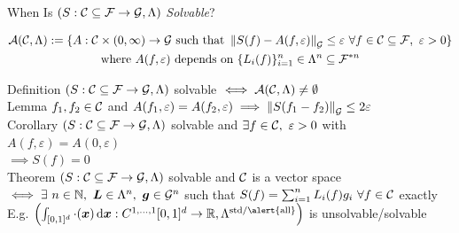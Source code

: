 \documentclass[11pt,compress,xcolor={usenames,dvipsnames},aspectratio=169]{beamer}
\newcommand{\sol}{S}
\newcommand{\app}{A}
\begin{document}
\begin{frame}{When Is $(S:\cc \subseteq \cf\to\cg,\Lambda)$ \emph{Solvable}?}

\vspace{-7ex}
\begin{multline*}
     \ca(\cc,\Lambda) : = \{\app: \cc \times (0,\infty) \to \cg \text{ such that } 
\norm[\cg]{\sol(f) - \app(f,\varepsilon) } \le \varepsilon \ \forall f \in \cc \subseteq \cf, \ \varepsilon > 0 \}
  \\
  \text{where $A(f,\varepsilon)$ depends on } \{L_i(f)\}_{i=1}^n \in \Lambda^n \subseteq \cf^{*n}
\end{multline*}

\vspace{-3ex}

\alert{Definition} \quad $(S:\cc \subseteq \cf\to\cg,\Lambda)$ \alert{solvable} $\iff \ca(\cc,\Lambda) \ne \emptyset$\\[1ex]
\alert{Lemma}  \quad $f_1, f_2 \in \cc$  and $A(f_1, \varepsilon) = A(f_2,\varepsilon) \implies \norm[\cg]{S(f_1-f_2)} \le 2\varepsilon$\\[1ex]
\alert{Corollary} \label{ZeroCorollary} \quad $(S:\cc \subseteq \cf\to\cg,\Lambda)$ \alert{solvable} and $\exists f \in \cc,\  \varepsilon > 0$ with $A(f,\varepsilon) = A(0,\varepsilon)$  \\ \hfill \hfill $\implies S(f) = 0$\\[1ex]
\alert{Theorem} \label{VectorSpaceThm}\quad $(S:\cc \subseteq \cf\to\cg,\Lambda)$ \alert{solvable} and $\cc$ is a \alert{vector space} \\ \hfill \hfill 
$\iff \exists \ n \in \naturals, \ \vL \in \Lambda^n, \ \vg \in \cg^n$ such that $S(f) = \sum_{i=1}^n L_i(f) g_i \ \forall f \in \cc$ \alert{exactly}   \hyperlink{VectorSpaceThmProof}{}\\[1ex]
E.g. $\left(\int_{[0,1]^d} \cdot (\vx) \, \dif \vx: C^{1,\ldots,1}[0,1]^d\to\reals,\Lambda^{\textup{std/\alert{all}}}\right)$ is unsolvable/\alert{solvable}
    
\end{frame}

\end{document}
